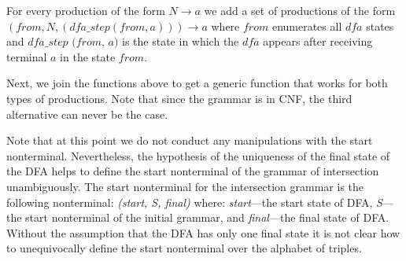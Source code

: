 For every production of the form $N \to a$ we add a set of productions of the form $(\textit{from}, N, (\textit{dfa\_step}(\textit{from}, a))) \to a$ where $\textit{from}$ enumerates all $\textit{dfa}$ states and $\textit{dfa\_step (from, a)}$ is the state in which the $\textit{dfa}$ appears after receiving terminal $a$ in the state $\textit{from}$.


Next, we join the functions above to get a generic function that works for both types of productions.
Note that since the grammar is in CNF, the third alternative can never be the case.




Note that at this point we do not conduct any manipulations with the start nonterminal. Nevertheless, the hypothesis of the uniqueness of the final state of the DFA helps to define the start nonterminal of the grammar of intersection unambiguously. The start nonterminal for the intersection grammar is the following nonterminal: \textit{(start, S, final)} where: \textit{start}---the start state of DFA, \textit{S}---the start nonterminal of the initial grammar, and \textit{final}---the final state of DFA. Without the assumption that the DFA has only one final state it is not clear how to unequivocally define the start nonterminal over the alphabet of triples.

